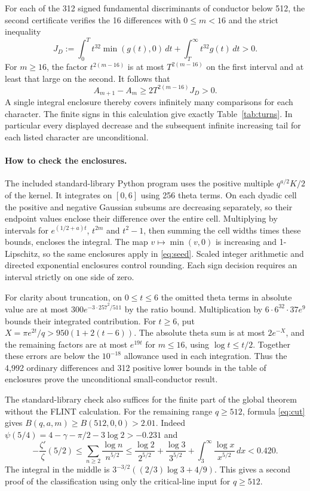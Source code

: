 \documentclass[11pt]{article}
\numberwithin{equation}{section}
\begin{document}
For each of the 312 signed fundamental discriminants of conductor below 512, the second certificate verifies the 16 differences with $0\le m<16$ and the strict inequality
\begin{equation}\label{eq:seed}
 J_D:=\int_0^T t^{32}\min(g(t),0)\,dt+\int_T^\infty t^{32}g(t)\,dt>0.
\end{equation}
For $m\ge16$, the factor $t^{2(m-16)}$ is at most $T^{2(m-16)}$ on the first interval and at least that large on the second. It follows that
\[
 A_{m+1}-A_m\ge 2T^{2(m-16)}J_D>0.
\]
A single integral enclosure thereby covers infinitely many comparisons for each character. The finite signs in this calculation give exactly Table~\ref{tab:turns}. In particular every displayed decrease and the subsequent infinite increasing tail for each listed character are unconditional.

\paragraph{How to check the enclosures.}
The included standard-library Python program uses the positive multiple $q^{a/2}K/2$ of the kernel. It integrates on $[0,6]$ using 256 theta terms. On each dyadic cell the positive and negative Gaussian subsums are decreasing separately, so their endpoint values enclose their difference over the entire cell. Multiplying by intervals for $e^{(1/2+a)t}$, $t^{2m}$ and $t^2-1$, then summing the cell widths times these bounds, encloses the integral. The map $v\mapsto\min(v,0)$ is increasing and 1-Lipschitz, so the same enclosures apply in \eqref{eq:seed}. Scaled integer arithmetic and directed exponential enclosures control rounding. Each sign decision requires an interval strictly on one side of zero.

For clarity about truncation, on $0\le t\le6$ the omitted theta terms in absolute value are at most $300e^{-3\cdot257^2/511}$ by the ratio bound. Multiplication by $6\cdot6^{32}\cdot37e^9$ bounds their integrated contribution. For $t\ge6$, put $X=\pi e^{2t}/q>950(1+2(t-6))$. The absolute theta sum is at most $2e^{-X}$, and the remaining factors are at most $e^{19t}$ for $m\le16$, using $\log t\le t/2$. Together these errors are below the $10^{-18}$ allowance used in each integration. Thus the 4,992 ordinary differences and 312 positive lower bounds in the table of enclosures prove the unconditional small-conductor result.

The standard-library check also suffices for the finite part of the global theorem without the FLINT calculation. For the remaining range $q\ge512$, formula \eqref{eq:cut} gives $B(q,a,m)\ge B(512,0,0)>2.01$. Indeed $\psi(5/4)=4-\gamma-\pi/2-3\log2> -0.231$ and
\[
 -\frac{\zeta'}{\zeta}(5/2)\le\sum_{n\ge2}\frac{\log n}{n^{5/2}}
 \le\frac{\log2}{2^{5/2}}+\frac{\log3}{3^{5/2}}+
 \int_3^\infty\frac{\log x}{x^{5/2}}\,dx<0.420 .
\]
The integral in the middle is $3^{-3/2}((2/3)\log 3+4/9)$. This gives a second proof of the classification using only the critical-line input for $q\ge512$.
\end{document}
